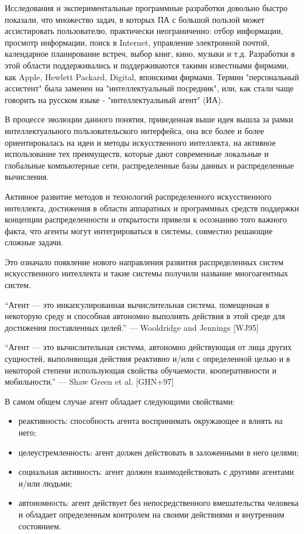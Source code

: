 Исследования и экспериментальные программные разработки довольно
быстро показали, что множество задач, в которых ПА с большой пользой может ассистировать пользователю, практически неограниченно: отбор информации, просмотр информации, поиск в Internet, управление электронной почтой, календарное планирование встреч, выбор книг, кино, музыки и т.д. Разработки в этой области поддерживались и поддерживаются такими известными фирмами, как Apple, Hewlett Packard, Digital, японскими фирмами. Термин
"персональный ассистент" была заменен на "интеллектуальный посредник",
или, как стали чаще говорить на русском языке - "интеллектуальный агент"
(ИА). 

В процессе эволюции данного понятия, приведенная выше идея вышла
за рамки интеллектуального пользовательского интерфейса, она все более и
более ориентировалась на идеи и методы искусственного интеллекта, на активное использование тех преимуществ, которые дают современные локальные и глобальные компьютерные сети, распределенные базы данных и распределенные вычисления. 

Активное развитие методов и технологий распределенного искусственного интеллекта, достижения в области аппаратных и программных средств
поддержки концепции распределенности и открытости привели к осознанию
того важного факта, что агенты могут интегрироваться в системы, совместно
решающие сложные задачи.

Это означало появление нового направления развития распределенных
систем искусственного интеллекта и такие системы получили название многоагентных систем.

“Агент — это инкапсулированная вычислительная система,
помещенная в некоторую среду и способная автономно выполнять
действия в этой среде для достижения поставленных целей.”
— Wooldridge and Jennings [WJ95]

“Агент — это вычислительная система, автономно действующая
от лица других сущностей, выполняющая действия реактивно
и/или с определенной целью и в некоторой степени
использующая свойства обучаемости, кооперативности и
мобильности.”
— Shaw Green et al. [GHN+97]

В самом общем случае агент обладает следующими свойствами:
\begin{itemize}
  \item реактивность: способность агента воспринимать окружающее и
влиять на него;
  \item целеустремленность: агент должен действовать в заложенными в
него целями;
  \item социальная активность: агент должен взаимодействовать с
другими агентами и/или людьми;
  \item автономность: агент действует без непосредственного
вмешательства человека и обладает определенным контролем на
своими действиями и внутренним состоянием.
\end{itemize}

